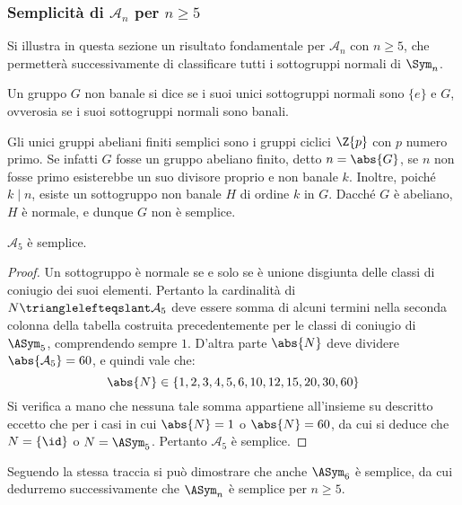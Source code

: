 \documentclass[11pt]{scrartcl}
\begin{document}
	\subsubsection{Semplicità di \texorpdfstring{$\mathcal{A}_n$}{Aₙ} per \texorpdfstring{$n \geq 5$}{n≥5}}
	
	Si illustra in questa sezione un risultato fondamentale per
	$\mathcal{A}_n$ con $n \geq 5$, che permetterà successivamente
	di classificare tutti i sottogruppi normali di $\Sym_n$.
	
	\begin{definition}
		Un gruppo $G$ non banale si dice  se i suoi unici sottogruppi
		normali sono $\{e\}$ e $G$, ovverosia se i suoi sottogruppi normali sono
		banali.
	\end{definition}
	
	\begin{remark}
		Gli unici gruppi abeliani finiti semplici sono i gruppi ciclici $\Z{p}$ con
		$p$ numero primo. Se infatti $G$ fosse un gruppo abeliano finito, detto
		$n = \abs{G}$, se $n$ non fosse primo esisterebbe un suo divisore proprio e
		non banale $k$. Inoltre, poiché $k \mid n$, esiste un sottogruppo non banale $H$
		di ordine $k$ in $G$. Dacché $G$ è abeliano, $H$ è normale, e dunque $G$
		non è semplice.
	\end{remark}
	
	\begin{proposition}
		\label{prop1.61}
		$\mathcal{A}_5$ è semplice.
	\end{proposition}
	
	\begin{proof}
		Un sottogruppo è normale se e solo se è unione disgiunta
		delle classi di coniugio dei suoi elementi. Pertanto la cardinalità
		di $N \trianglelefteqslant \mathcal{A}_5$ deve essere somma di alcuni 
		termini nella seconda colonna della tabella costruita precedentemente
		per le classi di coniugio di $\ASym_5$,
		comprendendo sempre $1$. D'altra parte $\abs{N}$ deve dividere
		$\abs{\mathcal{A}_5} = 60$, e quindi vale che:
		\[ \abs{N} \in \{ 1, 2, 3, 4, 5, 6, 10, 12, 15, 20, 30, 60 \} \]
		Si verifica a mano che nessuna tale somma appartiene all'insieme su descritto
		eccetto che per i casi in cui $\abs{N} = 1$ o $\abs{N} = 60$, da cui
		si deduce che $N = \{\id\}$ o $N = \ASym_5$.
		Pertanto $\mathcal{A}_5$ è semplice.
	\end{proof}
	
	Seguendo la stessa traccia si può dimostrare che anche $\ASym_6$ è semplice, da cui
	dedurremo successivamente che $\ASym_n$ è semplice per $n \geq 5$.
\end{document}
